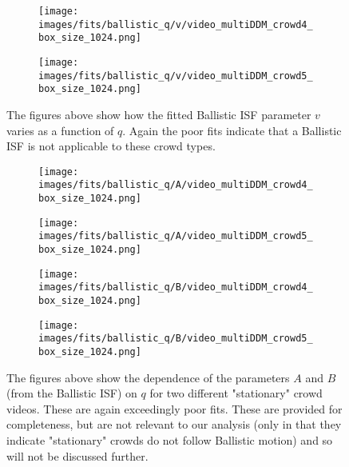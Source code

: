 \documentclass[10pt]{article}
\begin{document}
\begin{figure}[H]
\begin{subfigure}[t]{.5\textwidth}
  \centering
  \texttt{[image: images/fits/ballistic\_q/v/video\_multiDDM\_crowd4\_box\_size\_1024.png]}
  \caption{}
\end{subfigure}%
\hfill
\begin{subfigure}[t]{.5\textwidth}
  \centering
  \texttt{[image: images/fits/ballistic\_q/v/video\_multiDDM\_crowd5\_box\_size\_1024.png]}
  \caption{}
\end{subfigure}
\caption{The figures above show how the fitted Ballistic ISF parameter $v$ varies as a function of $q$. Again the poor fits indicate that a Ballistic ISF is not applicable to these crowd types.}
\label{fig:crowd_ballistic_fits_v}
\end{figure}

\begin{figure}[H]
\begin{subfigure}[t]{.5\textwidth}
  \centering
  \texttt{[image: images/fits/ballistic\_q/A/video\_multiDDM\_crowd4\_box\_size\_1024.png]}
  \caption{}
\end{subfigure}%
\hfill
\begin{subfigure}[t]{.5\textwidth}
  \centering
  \texttt{[image: images/fits/ballistic\_q/A/video\_multiDDM\_crowd5\_box\_size\_1024.png]}
  \caption{}
\end{subfigure}
\label{fig:crowd_ballistic_fits_A}
\par\bigskip
\begin{subfigure}[t]{.5\textwidth}
  \centering
  \texttt{[image: images/fits/ballistic\_q/B/video\_multiDDM\_crowd4\_box\_size\_1024.png]}
  \caption{}
\end{subfigure}%
\hfill
\begin{subfigure}[t]{.5\textwidth}
  \centering
  \texttt{[image: images/fits/ballistic\_q/B/video\_multiDDM\_crowd5\_box\_size\_1024.png]}
  \caption{}
\end{subfigure}
\caption{The figures above show the dependence of the parameters $A$ and $B$ (from the Ballistic ISF) on $q$ for two different "stationary" crowd videos. These are again exceedingly poor fits. These are provided for completeness, but are not relevant to our analysis (only in that they indicate "stationary" crowds do not follow Ballistic motion) and so will not be discussed further.}
\label{fig:crowd_ballistic_fits_B}
\end{figure}
\end{document}
